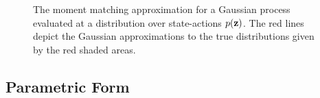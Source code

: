 \begin{figure}[t]
\caption{The moment matching approximation for a Gaussian process evaluated at a distribution over state-actions $p(\mathbf{z})$. The red lines depict the Gaussian approximations to the true distributions given by the red shaded areas.}
\label{fig:multiprop}
\end{figure}





\subsection{Parametric Form}
